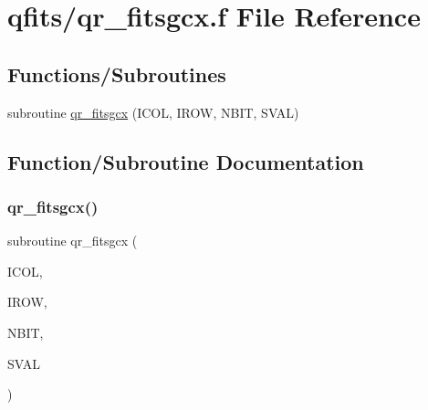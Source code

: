 \hypertarget{qr__fitsgcx_8f}{}\section{qfits/qr\+\_\+fitsgcx.f File Reference}
\label{qr__fitsgcx_8f}
\subsection*{Functions/\+Subroutines}
\begin{DoxyCompactItemize}
\item 
subroutine \hyperlink{qr__fitsgcx_8f_a9d36f9dde0b78c389dcbfd79355ec5b2}{qr\+\_\+fitsgcx} (I\+C\+OL, I\+R\+OW, N\+B\+IT, S\+V\+AL)
\end{DoxyCompactItemize}


\subsection{Function/\+Subroutine Documentation}
\mbox{\label{qr__fitsgcx_8f_a9d36f9dde0b78c389dcbfd79355ec5b2}} 
\subsubsection{\texorpdfstring{qr\+\_\+fitsgcx()}{qr\_fitsgcx()}}
{\footnotesize\ttfamily subroutine qr\+\_\+fitsgcx (\begin{DoxyParamCaption}\item[{integer}]{I\+C\+OL,  }\item[{integer}]{I\+R\+OW,  }\item[{integer}]{N\+B\+IT,  }\item[{character, dimension(nbit)}]{S\+V\+AL }\end{DoxyParamCaption})}

